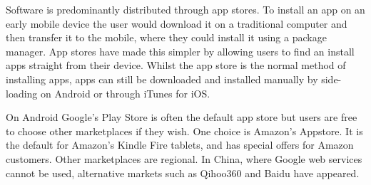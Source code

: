 \documentclass[thesis.tex]{subfiles}
\begin{document}
Software is predominantly distributed through app stores.
To install an app on an early mobile device the user would
download it on a traditional computer and then transfer it to the
mobile, where they could install it using a package manager.  App
stores have made this simpler by allowing users to find
an install apps straight from their device.  Whilst the app store is
the normal method of installing apps, apps can still be downloaded and
installed manually by side-loading on Android or through iTunes for
iOS.

On Android Google's Play Store is often the
default app store but users are free to choose other marketplaces if they wish.
One choice is Amazon's Appstore.  It is the default for Amazon's
Kindle Fire tablets, and has special offers for Amazon customers.
Other marketplaces are regional.  In China, where Google web services
cannot be used, alternative markets such as Qihoo360 and Baidu have
appeared.


%
\end{document}
